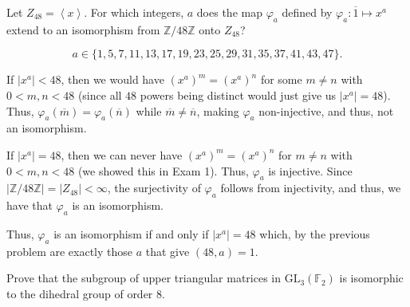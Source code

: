 \documentclass[12 pt, letterpaper]{hmcpset}
\begin{document}
\pagebreak

\begin{problem}
	Let $Z_{48} = \left < x \right >$. For which integers, $a$ does the map $\varphi_{a}$ defined by $\varphi_{a} : \overline{1} \mapsto x^{a}$ extend to an isomorphism from $\mathbb{Z} / 48 \mathbb{Z}$ onto $Z_{48}$?
\end{problem}

\begin{solution}
	\[
		\boxed{
			a \in \{ 1, 5, 7, 11, 13, 17, 19, 23, 25, 29, 31, 35, 37, 41, 43, 47 \}.
		}
	\]

	If $\lvert x^{a} \rvert < 48$, then we would have $(x^{a})^{m} = (x^{a})^{n}$ for some $m \neq n$ with $0 < m, n < 48$ (since all $48$ powers being distinct would just give us $\lvert x^{a} \rvert = 48$). Thus, $\varphi_{a}(\overline{m}) = \varphi_{a}(\overline{n})$ while $\overline{m} \neq \overline{n}$, making $\varphi_{a}$ non-injective, and thus, not an isomorphism. 

	If $\lvert x^{a} \rvert = 48$, then we can never have $(x^{a})^{m} = (x^{a})^{n}$ for $m \neq n$ with $0 < m, n < 48$ (we showed this in Exam 1). Thus, $\varphi_{a}$ is injective. Since $\lvert \mathbb{Z}/48 \mathbb{Z} \rvert = \lvert Z_{48} \rvert < \infty$, the surjectivity of $\varphi_{a}$ follows from injectivity, and thus, we have that $\varphi_{a}$ is an isomorphism. 

	Thus, $\varphi_{a}$ is an isomorphism if and only if $\lvert x^{a} \rvert = 48$ which, by the previous problem are exactly those $a$ that give $(48, a) = 1$.
\end{solution}	

\pagebreak

\begin{problem}
	Prove that the subgroup of upper triangular matrices in $\mathrm{GL}_{3}(\mathbb{F}_{2})$ is isomorphic to the dihedral group of order $8$.
\end{problem}
\end{document}
